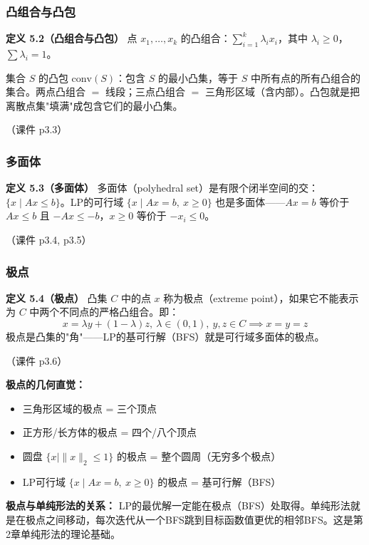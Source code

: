 \subsubsection{凸组合与凸包}

\textbf{定义 5.2（凸组合与凸包）}
点 $x_1,\dots,x_k$ 的凸组合：$\sum_{i=1}^k \lambda_i x_i$，其中 $\lambda_i \ge 0$，$\sum \lambda_i = 1$。

集合 $S$ 的凸包 $\text{conv}(S)$：包含 $S$ 的最小凸集，等于 $S$ 中所有点的所有凸组合的集合。两点凸组合 $=$ 线段；三点凸组合 $=$ 三角形区域（含内部）。凸包就是把离散点集"填满"成包含它们的最小凸集。

（课件 p3.3）

\subsubsection{多面体}

\textbf{定义 5.3（多面体）}
多面体（polyhedral set）是有限个闭半空间的交：$\{x \mid Ax \le b\}$。LP的可行域 $\{x \mid Ax = b,\ x \ge 0\}$ 也是多面体——$Ax=b$ 等价于 $Ax\le b$ 且 $-Ax\le -b$，$x\ge0$ 等价于 $-x_i\le 0$。

（课件 p3.4, p3.5）

\subsubsection{极点}

\textbf{定义 5.4（极点）}
凸集 $C$ 中的点 $x$ 称为极点（extreme point），如果它不能表示为 $C$ 中两个不同点的严格凸组合。即：
\[
x = \lambda y + (1-\lambda)z,\ \lambda\in(0,1),\ y,z\in C \implies x=y=z
\]
极点是凸集的"角"——LP的基可行解（BFS）就是可行域多面体的极点。

（课件 p3.6）

\textbf{极点的几何直觉：}
\begin{itemize}
  \item 三角形区域的极点 = 三个顶点
  \item 正方形/长方体的极点 = 四个/八个顶点
  \item 圆盘 $\{x \mid \|x\|_2 \le 1\}$ 的极点 = 整个圆周（无穷多个极点）
  \item LP可行域 $\{x \mid Ax=b,\ x\ge0\}$ 的极点 = 基可行解（BFS）
\end{itemize}

\textbf{极点与单纯形法的关系：} LP的最优解一定能在极点（BFS）处取得。单纯形法就是在极点之间移动，每次迭代从一个BFS跳到目标函数值更优的相邻BFS。这是第2章单纯形法的理论基础。

